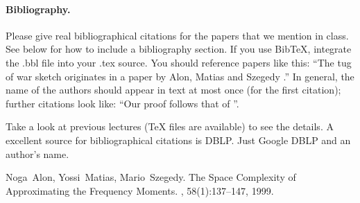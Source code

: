 \documentclass[11pt]{article}
\begin{document}
\paragraph{Bibliography.}
Please give real bibliographical citations for the papers that we
mention in class. See below for how to include a bibliography section.
If you use BibTeX, integrate the .bbl file into your .tex
source. You should reference papers like this: ``The tug of war sketch
originates in a paper by Alon, Matias and Szegedy \cite{AlonMS99}.''
In general, the name of the authors should appear in text at most once 
(for the first citation); further citations look like: ``Our proof follows 
that of \cite{AlonMS99}''.

Take a look at previous lectures (TeX files are available) to see the
details. A excellent source for bibliographical citations is
DBLP. Just Google DBLP and an author's name.




\begin{thebibliography}{42}

Noga~Alon, Yossi~Matias, Mario~Szegedy.
\newblock The Space Complexity of Approximating the Frequency Moments.
, 58(1):137--147, 1999.

\end{thebibliography}
\end{document}
